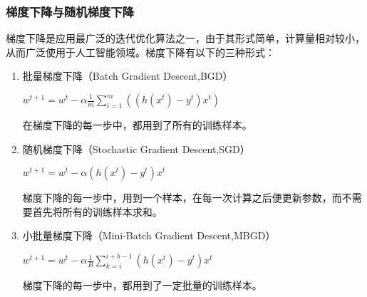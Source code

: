 \documentclass[twoside]{article}
\begin{document}
\subsubsection*{梯度下降与随机梯度下降}
梯度下降是应用最广泛的迭代优化算法之一，由于其形式简单，计算量相对较小，从而广泛使用于人工智能领域。梯度下降有以下的三种形式：
\begin{enumerate}
    \item 批量梯度下降（Batch Gradient Descent,BGD）\begin{center}
        $w^{t+1}=w^{t}-\alpha \frac{1}{m} \sum\limits_{i=1}^{m}\left(\left(h(x^t)-y^t\right)x^t \right) $
    \end{center}
    在梯度下降的每一步中，都用到了所有的训练样本。
    
    \item 随机梯度下降（Stochastic Gradient Descent,SGD）\begin{center}
        $w^{t+1}=w^t-\alpha\left(h(x^t)-y^t\right)x^t$
    \end{center}
    梯度下降的每一步中，用到一个样本，在每一次计算之后便更新参数，而不需要首先将所有的训练样本求和。
    
    \item 小批量梯度下降（Mini-Batch Gradient Descent,MBGD）
    \begin{center}
        $w^{t+1}=w^t-\alpha \frac{1}{B} \sum\limits_{k=i}^{i+b-1}\left(h(x^t)-y^t\right)x^t$
    \end{center}
    梯度下降的每一步中，都用到了一定批量的训练样本。
\end{enumerate}
\end{document}
